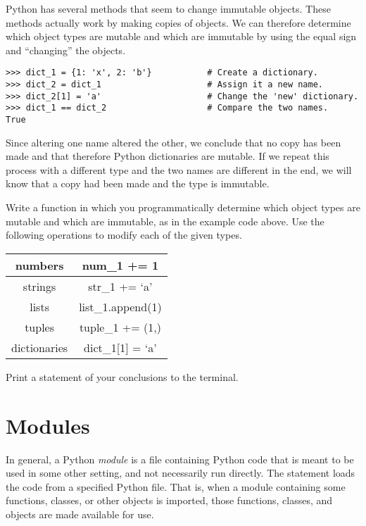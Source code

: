 \begin{problem}
Python has several methods that seem to change immutable objects.
These methods actually work by making copies of objects.
We can therefore determine which object types are mutable and which are immutable by using the equal sign and ``changing'' the objects.

\begin{lstlisting}
>>> dict_1 = {1: 'x', 2: 'b'}           # Create a dictionary.
>>> dict_2 = dict_1                     # Assign it a new name.
>>> dict_2[1] = 'a'                     # Change the 'new' dictionary.
>>> dict_1 == dict_2                    # Compare the two names.
True
\end{lstlisting}

Since altering one name altered the other, we conclude that no copy has been made and that therefore Python dictionaries are mutable.
If we repeat this process with a different type and the two names are different in the end, we will know that a copy had been made and the type is immutable.

Write a function in which you programmatically determine which object types are mutable and which are immutable, as in the example code above.
Use the following operations to modify each of the given types.

\begin{center}
\begin{tabular}{|c|c|}
\hline
numbers & num\_1 += 1 \\
\hline
strings & str\_1 += `a' \\
\hline
lists & list\_1.append(1) \\
\hline
tuples & tuple\_1 += (1,) \\
\hline
dictionaries & dict\_1[1] = `a' \\
\hline
\end{tabular}
\end{center}

Print a statement of your conclusions to the terminal.
\end{problem}

\section*{Modules}

In general, a Python \emph{module} is a file containing Python code that is meant to be used in some other setting, and not necessarily run directly.
The  statement loads the code from a specified Python file.
That is, when a module containing some functions, classes, or other objects is imported, those functions, classes, and objects are made available for use.

